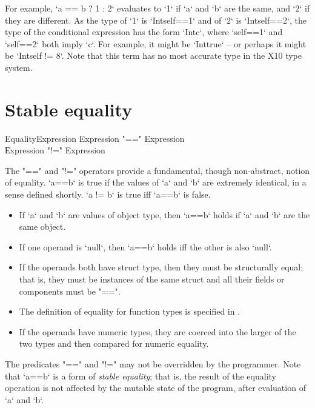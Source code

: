 For example, 
\xcd`a == b ? 1 : 2`
evaluates to \xcd`1` if \xcd`a` and \xcd`b` are the same, and \xcd`2` if they
are different.   As the type of \xcd`1` is \xcd`Int{self==1}` and of \xcd`2`
is \xcd`Int{self==2}`, the type of the conditional expression has the form
\xcd`Int{c}`, where \xcd`self==1` and \xcd`self==2` both imply \xcd`c`.  For
example, it might be \xcd`Int{true}` -- or perhaps it might be 
\xcd`Int{self != 8}`. Note that this term has no most accurate type in the X10
type system.

\section{Stable equality}
\label{StableEquality}
\index{==}\index{!=}

\begin{grammar}
EqualityExpression \: Expression \xcd"==" Expression \\
\| Expression \xcd"!=" Expression \\
\end{grammar}

The \xcd"==" and \xcd"!=" operators provide a fundamental, though
non-abstract, notion of equality.  \xcd`a==b` is true if the values of \xcd`a`
and \xcd`b` are extremely identical, in a sense defined shortly.  \xcd`a != b`
is true iff \xcd`a==b` is false.

\begin{itemize}
\item If \xcd`a` and \xcd`b` are values of object type, then \xcd`a==b` holds
      if \xcd`a` and \xcd`b` are the same object.
\item If one operand is \xcd`null`, then \xcd`a==b` holds iff the other is
      also \xcd`null`.
\item If the operands both have struct type, then they must be structurally equal;
that is, they must be instances of the same struct
and all their fields or components must be \xcd"==". 
\item The definition of equality for function types is specified in
      .
\item If the operands have numeric types, they are coerced into the larger of
      the two types and then compared for numeric equality.
\end{itemize}

The predicates \xcd"==" and \xcd"!=" may not be overridden by the programmer.
Note that \xcd`a==b` is a form of \emph{stable equality}; that is, the result of
the equality operation is not affected by the mutable state of the program,
after evaluation of \xcd`a` and \xcd`b`. 


